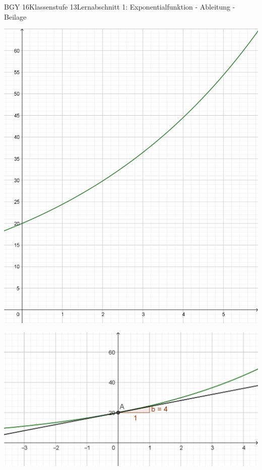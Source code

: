 \documentclass[oneside,openany,headings=optiontotoc,11pt,numbers=noenddot]{scrreprt}
\begin{document}
\begin{worksheet}{BGY 16}{Klassenstufe 13}{Lernabschnitt 1: Exponentialfunktion - Ableitung - Beilage}
\begin{framed}
			\includegraphics[width=\textwidth]{../99_Bilder/01_ExpFkt/eFkt.png}
		\end{framed}
		\newpage
		\begin{framed}
			\noindent
			\includegraphics[width=\textwidth]{../99_Bilder/01_ExpFkt/AbleFkt/0O.png}\\
		\end{framed}
		\begin{framed}

\end{framed}
\end{worksheet}
\end{document}
